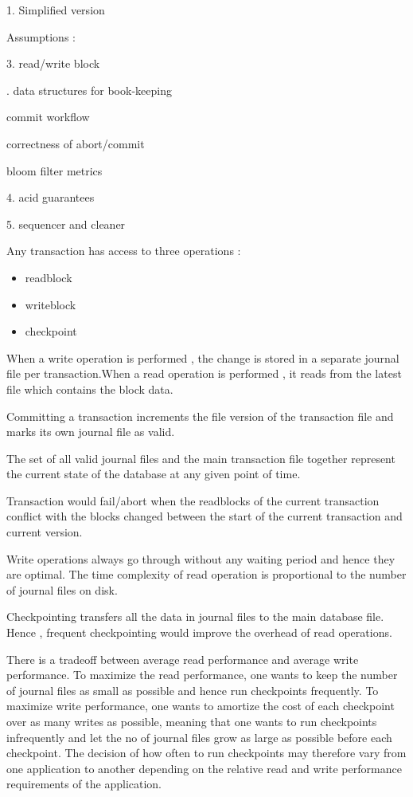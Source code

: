 \documentclass[11pt,a4paper]{article}
\begin{document}
1. Simplified version

Assumptions :


3. read/write block 

. data structures for book-keeping

commit workflow

correctness of abort/commit

bloom filter metrics

4. acid guarantees

5. sequencer and cleaner


Any transaction has access to three operations :
\begin{itemize}
\item readblock
\item writeblock 
\item checkpoint
\end{itemize}


When a write operation is performed , the change is stored in a separate journal file per transaction.When a read operation is performed , it reads from the latest file which contains the block data.

Committing a transaction increments the file version of the transaction file and marks its own journal file as valid.

The set of all valid journal files and the main transaction file together represent the current state of the database at any given point of time.

Transaction would fail/abort when the readblocks of the current transaction conflict with the blocks changed between the start of the current transaction and current version.

Write operations always go through without any waiting period and hence they are optimal.
The time complexity of read operation is proportional to the number of journal files on disk.

Checkpointing transfers all the data in journal files to the main database file. Hence , frequent checkpointing would improve the overhead of read operations.

There is a tradeoff between average read performance and average write performance. To maximize the read performance, one wants to keep the number of journal files as small as possible and hence run checkpoints frequently. To maximize write performance, one wants to amortize the cost of each checkpoint over as many writes as possible, meaning that one wants to run checkpoints infrequently and let the no of journal files grow as large as possible before each checkpoint. The decision of how often to run checkpoints may therefore vary from one application to another depending on the relative read and write performance requirements of the application.
\end{document}
